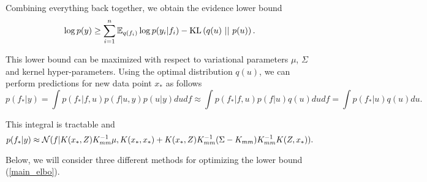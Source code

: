 Combining everything back together, we obtain the evidence lower bound
\begin{equation}
	\label{main_elbo}
	\log p(y) \ge \sum_{i = 1}^{n} \mathbb{E}_{q(f_i)} \log p(y_i | f_i) - \mbox{KL}\left(q(u)\mbox{ || }p(u)\right).
\end{equation}

This lower bound can be maximized with respect to variational parameters $\mu$, $\Sigma$ and kernel hyper-parameters. Using the optimal distribution $q(u)$, we can perform predictions for new data point $x_*$ as follows
$$p(f_* | y) = \int p(f_* | f, u) p(f| u, y) p(u | y) du df \approx \int p(f_* | f, u) p(f| u) q(u) du df = \int p(f_* | u) q(u) du.$$

This integral is tractable and
$$p(f_* | y) \approx \mathcal{N}(f| K(x_*, Z) K_{mm}^{-1} \mu, K(x_*, x_*) + K(x_*, Z) K_{mm}^{-1}(\Sigma - K_{mm}) K_{mm}^{-1} K(Z, x_*)).$$

Below, we will consider three different methods for optimizing the lower bound (\ref{main_elbo}).

